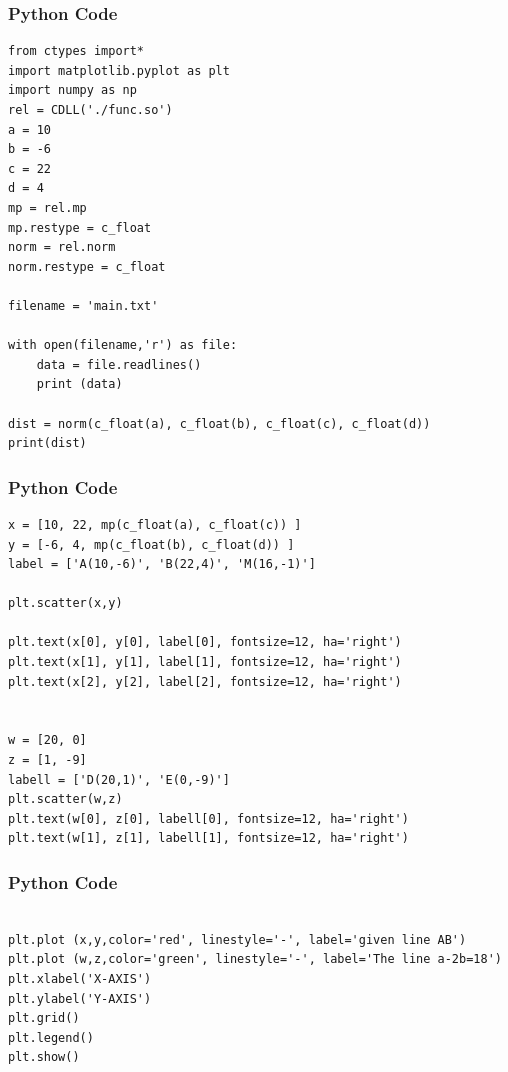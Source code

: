 \documentclass{beamer}
\begin{document}
\begin{frame}[fragile]
  \frametitle{Python Code }

\begin{verbatim}
from ctypes import*
import matplotlib.pyplot as plt
import numpy as np
rel = CDLL('./func.so')
a = 10
b = -6
c = 22
d = 4
mp = rel.mp
mp.restype = c_float
norm = rel.norm
norm.restype = c_float

filename = 'main.txt'

with open(filename,'r') as file:
    data = file.readlines()
    print (data)

dist = norm(c_float(a), c_float(b), c_float(c), c_float(d)) 
print(dist)
\end{verbatim}
\end{frame}
\begin{frame}[fragile]
  \frametitle{Python Code }

\begin{verbatim}
x = [10, 22, mp(c_float(a), c_float(c)) ]
y = [-6, 4, mp(c_float(b), c_float(d)) ]
label = ['A(10,-6)', 'B(22,4)', 'M(16,-1)']

plt.scatter(x,y)

plt.text(x[0], y[0], label[0], fontsize=12, ha='right')
plt.text(x[1], y[1], label[1], fontsize=12, ha='right')
plt.text(x[2], y[2], label[2], fontsize=12, ha='right')


w = [20, 0] 
z = [1, -9]
labell = ['D(20,1)', 'E(0,-9)']
plt.scatter(w,z)
plt.text(w[0], z[0], labell[0], fontsize=12, ha='right')
plt.text(w[1], z[1], labell[1], fontsize=12, ha='right')

\end{verbatim}
\end{frame}

\begin{frame}[fragile]
\frametitle{Python Code}

\begin{verbatim}

plt.plot (x,y,color='red', linestyle='-', label='given line AB')
plt.plot (w,z,color='green', linestyle='-', label='The line a-2b=18')
plt.xlabel('X-AXIS')
plt.ylabel('Y-AXIS')
plt.grid()
plt.legend()
plt.show()
\end{verbatim}
\end{frame}
\end{document}
